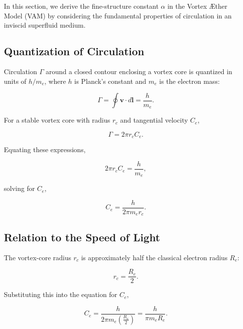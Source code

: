\documentclass[aps,preprint,superscriptaddress]{revtex4-2}
\begin{document}
    In this section, we derive the fine-structure constant $\alpha$ in the Vortex \AE ther Model (VAM) by considering the fundamental properties of circulation in an inviscid superfluid medium.

    \subsection{Quantization of Circulation}

    Circulation $\Gamma$ around a closed contour enclosing a vortex core is quantized in units of $h/m_e$, where $h$ is Planck’s constant and $m_e$ is the electron mass:

    \begin{equation}
        \Gamma = \oint \mathbf{v} \cdot d\mathbf{l} = \frac{h}{m_e}.
    \end{equation}

    For a stable vortex core with radius $r_c$ and tangential velocity $C_e$,

    \begin{equation}
        \Gamma = 2 \pi r_c C_e.
    \end{equation}

    Equating these expressions,

    \begin{equation}
        2 \pi r_c C_e = \frac{h}{m_e},
    \end{equation}

    solving for $C_e$,

    \begin{equation}
        C_e = \frac{h}{2 \pi m_e r_c}.
    \end{equation}

    \subsection{Relation to the Speed of Light}

    The vortex-core radius $r_c$ is approximately half the classical electron radius $R_e$:

    \begin{equation}
        r_c = \frac{R_e}{2}.
    \end{equation}

    Substituting this into the equation for $C_e$,

    \begin{equation}
        C_e = \frac{h}{2 \pi m_e \left(\frac{R_e}{2}\right)} = \frac{h}{\pi m_e R_e}.
    \end{equation}
\end{document}

